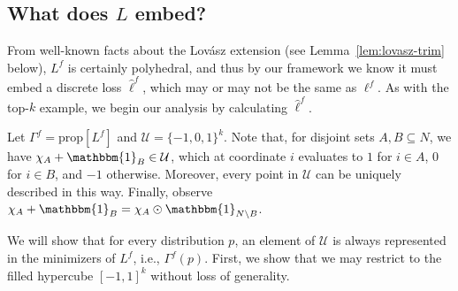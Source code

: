 \documentclass[11pt]{article}
\newcommand{\prop}[1]{\mathrm{prop}[#1]}
\newcommand{\U}{\mathcal{U}}
\newcommand{\ones}{\mathbbm{1}}
\begin{document}
\subsection{What does $L$ embed?}

From well-known facts about the Lov\'asz extension (see Lemma~\ref{lem:lovasz-trim} below), $L^f$ is certainly polyhedral, and thus by our framework we know it must embed a discrete loss $\hat\ell^f$, which may or may not be the same as $\ell^f$.
As with the top-$k$ example, we begin our analysis by calculating $\hat\ell^f$.

Let $\Gamma^f = \prop{L^f}$ and $\U = \{-1,0,1\}^k$.
Note that, for disjoint sets $A,B \subseteq N$, we have $\chi_A + \ones_B \in \U$, which at coordinate $i$ evaluates to $1$ for $i\in A$, $0$ for $i\in B$, and $-1$ otherwise.
Moreover, every point in $\U$ can be uniquely described in this way.
Finally, observe $\chi_A + \ones_B = \chi_A \odot \ones_{N\setminus B}$.

We will show that for every distribution $p$, an element of $\U$ is always represented in the minimizers of $L^f$, i.e., $\Gamma^f(p)$.
First, we show that we may restrict to the filled hypercube $[-1,1]^k$ without loss of generality.
\end{document}

